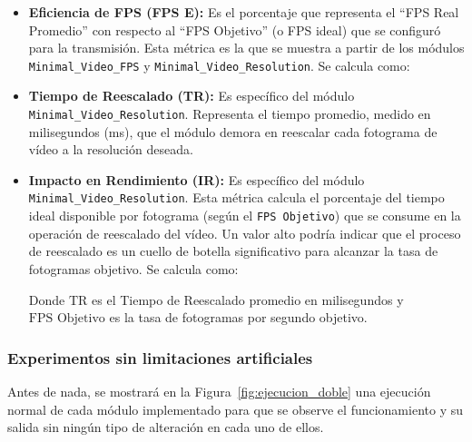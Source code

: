 \begin{itemize}
    \item \textbf{Eficiencia de FPS (FPS E):} Es el porcentaje que representa el ``FPS Real Promedio'' con respecto al ``FPS Objetivo'' (o FPS ideal) que se configuró para la transmisión. Esta métrica es la que se muestra a partir de los módulos \texttt{Minimal\_Video\_FPS} y \texttt{Minimal\_Video\_Resolution}. Se calcula como:
    \begin{center}
    \end{center}

    \newpage

    \item \textbf{Tiempo de Reescalado (TR):} Es específico del módulo \texttt{Minimal\_Video\_Resolution}. Representa el tiempo promedio, medido en milisegundos (ms), que el módulo demora en reescalar cada fotograma de vídeo a la resolución deseada.
    \begin{center}
    \end{center}

    \item \textbf{Impacto en Rendimiento (IR):} Es específico del módulo \texttt{Minimal\_Video\_Resolution}. Esta métrica calcula el porcentaje del tiempo ideal disponible por fotograma (según el \texttt{FPS Objetivo}) que se consume en la operación de reescalado del vídeo. Un valor alto podría indicar que el proceso de reescalado es un cuello de botella significativo para alcanzar la tasa de fotogramas objetivo. Se calcula como:
    \begin{center}
    \end{center}
    Donde \(\text{TR}\) es el Tiempo de Reescalado promedio en milisegundos y \(\text{FPS}\text{~Objetivo}\) es la tasa de fotogramas por segundo objetivo.
\end{itemize}

\newpage

\subsubsection{Experimentos sin limitaciones artificiales}

Antes de nada, se mostrará en la Figura~\ref{fig:ejecucion_doble} una ejecución normal de cada módulo implementado para que se observe el funcionamiento y su salida sin ningún tipo de alteración en cada uno de ellos. 
\vspace{\baselineskip}

